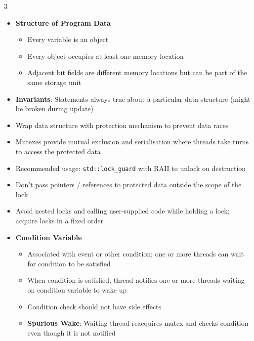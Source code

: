 \documentclass[10pt, landscape]{article}
\begin{document}
\begin{multicols*}{3}
\begin{itemize}
    \item \textbf{Structure of Program Data}
    \begin{itemize}
        \item Every variable is an object
        \item Every object occupies at least one memory location
        \item Adjacent bit fields are different memory locations but can be part of the same storage unit
    \end{itemize}
    \item \textbf{Invariants}: Statements always true about a particular data structure (might be broken during update)
    \item Wrap data structure with protection mechanism to prevent data races
    \item Mutexes provide mutual exclusion and serialisation where threads take turns to access the protected data
    \item Recommended usage: \verb|std::lock_guard| with RAII to unlock on destruction
    \item Don't pass pointers / references to protected data outside the scope of the lock
    \item Avoid nested locks and calling user-supplied code while holding a lock; acquire locks in a fixed order
    \item \textbf{Condition Variable}
    \begin{itemize}
        \item Associated with event or other condition; one or more threads can wait for condition to be satisfied
        \item When condition is satisfied, thread notifies one or more threads waiting on condition variable to wake up
        \item Condition check should not have side effects
        \item \textbf{Spurious Wake}: Waiting thread reacquires mutex and checks condition even though it is not notified
    \end{itemize}
\end{itemize}


\end{multicols*}
\end{document}
